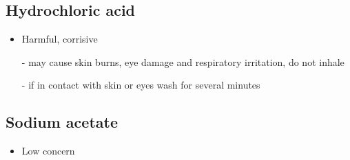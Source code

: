 \documentclass[a4paper, british]{article}
\begin{document}
\begin{appendices}
\subsection*{Hydrochloric acid}

\begin{itemize}
    \item Harmful, corrisive
    \item[-] may cause skin burns, eye damage and respiratory irritation, do not inhale
    \item[-] if in contact with skin or eyes wash for several minutes  
\end{itemize}

\subsection*{Sodium acetate}

\begin{itemize}
    \item Low concern
\end{itemize}
    
\end{appendices}
\end{document}
